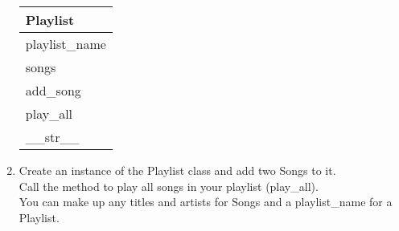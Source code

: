 \begin{enumerate}
			\begin{flushright}
			\begin{tabular}{|l|}
				\hline
				Playlist\\ \hline  	%
				playlist\_name \\ songs\\ \hline		%
				add\_song \\ play\_all \\ \_\_str\_\_ \\ \hline		%
			\end{tabular}
			\end{flushright}

		\item
			Create an instance of the Playlist class and add two Songs to it.\\
			Call the method to play all songs in your playlist (play\_all).\\
			You can make up any titles and artists for Songs and a playlist\_name for a Playlist.\\
	\end{enumerate}
\pagebreak


